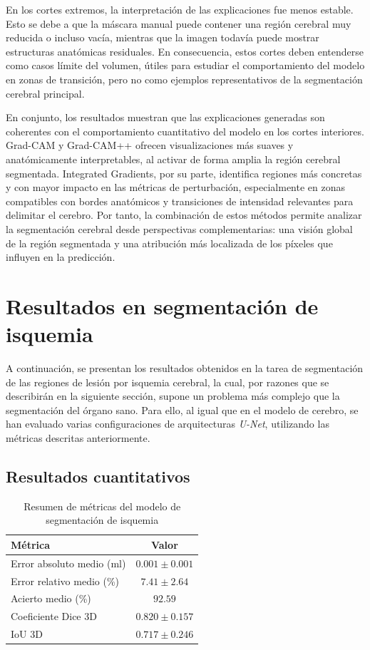 En los cortes extremos, la interpretación de las explicaciones fue menos estable. Esto se debe a que la máscara manual puede contener una región cerebral muy reducida o incluso vacía, mientras que la imagen todavía puede mostrar estructuras anatómicas residuales. En consecuencia, estos cortes deben entenderse como casos límite del volumen, útiles para estudiar el comportamiento del modelo en zonas de transición, pero no como ejemplos representativos de la segmentación cerebral principal.

En conjunto, los resultados muestran que las explicaciones generadas son coherentes con el comportamiento cuantitativo del modelo en los cortes interiores. Grad-CAM y Grad-CAM++ ofrecen visualizaciones más suaves y anatómicamente interpretables, al activar de forma amplia la región cerebral segmentada. Integrated Gradients, por su parte, identifica regiones más concretas y con mayor impacto en las métricas de perturbación, especialmente en zonas compatibles con bordes anatómicos y transiciones de intensidad relevantes para delimitar el cerebro. Por tanto, la combinación de estos métodos permite analizar la segmentación cerebral desde perspectivas complementarias: una visión global de la región segmentada y una atribución más localizada de los píxeles que influyen en la predicción.
\section{Resultados en segmentación de isquemia}
A continuación, se presentan los resultados obtenidos en la tarea de segmentación de las regiones de lesión por isquemia cerebral, la cual, por razones que se describirán en la siguiente sección, supone un problema más complejo que la segmentación del órgano sano. Para ello, al igual que en el modelo de cerebro, se han evaluado varias configuraciones de arquitecturas \textit{U-Net}, utilizando las métricas descritas anteriormente.

\subsection{Resultados cuantitativos} 
\begin{table}[h]
\centering
\caption{Resumen de métricas del modelo de segmentación de isquemia}
\begin{tabular}{lc}
\hline
\textbf{Métrica} & \textbf{Valor} \\
\hline
Error absoluto medio (ml) & $0.001 \pm 0.001$ \\
Error relativo medio (\%) & $7.41 \pm 2.64$ \\
Acierto medio (\%) & $92.59$ \\
Coeficiente Dice 3D & $0.820 \pm 0.157$ \\
IoU 3D & $0.717 \pm 0.246$ \\
\hline
\end{tabular}
\label{tab:metricas_isquemia}
\end{table}

